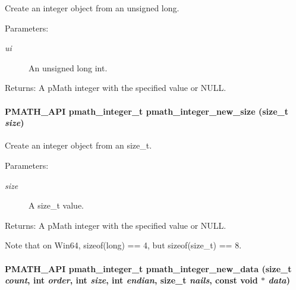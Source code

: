 Create an integer object from an unsigned long. 

\begin{Desc}
\item[Parameters:]
\begin{description}
\item[{\em ui}]An unsigned long int. \end{description}
\end{Desc}
\begin{Desc}
\item[Returns:]A pMath integer with the specified value or NULL. \end{Desc}
\hypertarget{group__numbers_g5fecb78f68ce62c05b1970cf1cf17dc6}{
\paragraph[{pmath\_\-integer\_\-new\_\-size}]{\setlength{\rightskip}{0pt plus 5cm}PMATH\_\-API {\bf pmath\_\-integer\_\-t} pmath\_\-integer\_\-new\_\-size (size\_\-t {\em size})}\hfill}
\label{group__numbers_g5fecb78f68ce62c05b1970cf1cf17dc6}


Create an integer object from an size\_\-t. 

\begin{Desc}
\item[Parameters:]
\begin{description}
\item[{\em size}]A size\_\-t value. \end{description}
\end{Desc}
\begin{Desc}
\item[Returns:]A pMath integer with the specified value or NULL.\end{Desc}
Note that on Win64, sizeof(long) == 4, but sizeof(size\_\-t) == 8. \hypertarget{group__numbers_g7ffd98a7d3634c79d261b67f76b1d011}{
\paragraph[{pmath\_\-integer\_\-new\_\-data}]{\setlength{\rightskip}{0pt plus 5cm}PMATH\_\-API {\bf pmath\_\-integer\_\-t} pmath\_\-integer\_\-new\_\-data (size\_\-t {\em count}, \/  int {\em order}, \/  int {\em size}, \/  int {\em endian}, \/  size\_\-t {\em nails}, \/  const void $\ast$ {\em data})}\hfill}
\label{group__numbers_g7ffd98a7d3634c79d261b67f76b1d011}


